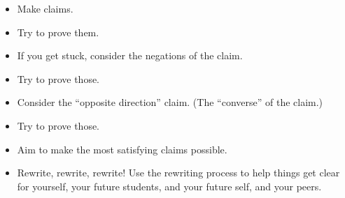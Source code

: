\documentclass[11pt]{article}
\theoremstyle{definition}
\begin{document}
\begin{itemize}
\item Make claims.

\item Try to prove them.

\item If you get stuck, consider the negations of the claim.

\item Try to prove those.

\item Consider the ``opposite direction'' claim. (The ``converse'' of the claim.)  

\item Try to prove those.

\item Aim to make the most satisfying claims possible.

\item Rewrite, rewrite, rewrite! Use the rewriting process to help things get clear for yourself, your future students, and your future self, and your peers.

\end{itemize}





\newpage
\end{document}
